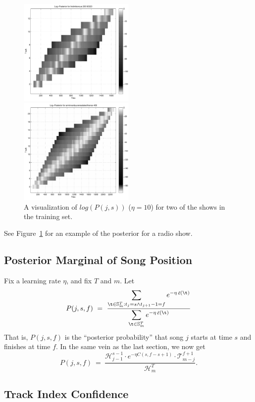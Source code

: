 \documentclass[twocolumn]{article}
\DeclareMathOperator{\loss}{\ell}
\newcommand{\segs}{\mathbb S}
\newcommand{\head}{\mathcal H}
\newcommand{\tail}{\mathcal T}
\begin{document}
\begin{figure}
	\centering
	\includegraphics[width=0.5\textwidth]{images/posterior2}

	\bigskip

	\includegraphics[width=0.5\textwidth]{images/posterior3}
	\caption{A visualization of $log(P(j,s))$ ($\eta=10$) for two of the shows in the training set.}
	\label{fig:posterior3}
\end{figure} 

See Figure~\ref{fig:posterior3} for an example of the posterior for a radio show. 

\subsection{Posterior Marginal of Song Position}
Fix a learning rate $\eta$, and fix $T$ and $m$. Let
\[
P(j,s,f) ~=~ 
\frac{\displaystyle
	\sum_{\t \in \segs^T_m : t_j = s \land t_{j+1}-1 = f} e^{- \eta \loss(\t)}
}{\displaystyle
\sum_{\t \in \segs^T_m} e^{- \eta \loss(\t)}
}
\]
That is, $P(j,s,f)$ is the ``posterior probability'' that song $j$ starts at time $s$ and finishes at time $f$.
%
In the same vein as the last section, we now get
\[
P(j,s,f) ~=~ \frac{\head^{s-1}_{j-1} \cdot e^{-\eta C(s, f-s+1)} \cdot \tail^{f+1}_{m-j}}{\head^T_m}.
\]


\subsection{Track Index Confidence}
\end{document}
